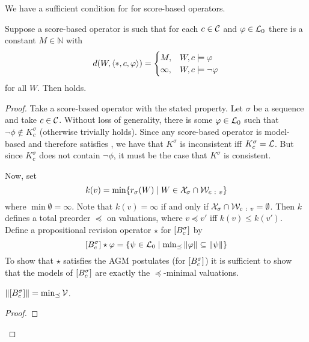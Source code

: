 We have a sufficient condition for \agm{} for score-based operators.

\begin{lemma}
    \label{kr_lemma_score_based_agm_sufficient_conditions}
    Suppose a score-based operator is such that for each $c \in \mathcal{C}$ and $\varphi
    \in \mathcal{L}{}_0$ there is a constant $M \in \mathbb{N}$ with
    \[
        d(W, \langle {\ast, c,  \varphi} \rangle)
        = \begin{cases}
            M,& W, c \models \varphi  \\
            \infty,& W, c \models \neg \varphi
        \end{cases}
    \]
    for all $W$. Then \agm{} holds.
\end{lemma}

\begin{proof}
    Take a score-based operator with the stated property. Let $\sigma$ be a
    sequence and take $c \in \mathcal{C}$. Without loss of generality, there is some
    $\varphi \in \mathcal{L}{}_0$ such that $\neg\phi \notin K^\sigma_c$ (otherwise \agm{}
    trivially holds). Since any score-based operator is model-based and
    therefore satisfies \closure{}, we have that $K^\sigma$ is inconsistent iff
    $K^\sigma_c = \mathcal{L}{}$. But since $K^\sigma_c$ does not contain $\neg\phi$,
    it must be the case that $K^\sigma$ is consistent.

    Now, set
    \[
        k(v)
        = \min\{
            r_\sigma(W)
            \mid
            W \in \mathcal{X}_\sigma \cap \mathcal{W}_{c\ :\ v}
        \}
    \]
    where $\min\emptyset =  \infty$. Note that $k(v) = \infty$ if and only if
    $\mathcal{X}_\sigma \cap \mathcal{W}_{c\ :\  v} = \emptyset$. Then $k$ defines a total
    preorder $\preceq$ on valuations, where $v \preceq v'$ iff $k(v) \le
    k(v')$. Define a propositional revision operator $\star$ for
    $\left[{B^\sigma_c}\right]$ by
    \[
        \left[{B^\sigma_c}\right] \star \varphi = \{
            \psi \in \mathcal{L}{}_0
            \mid
            \min\nolimits_{\preceq}{\|{\varphi}\|} \subseteq \|{\psi}\|
        \}
    \]
    To show that $\star$ satisfies the AGM postulates (for
    $\left[{B^\sigma_c}\right]$) it is sufficient to show that the models of
    $\left[{B^\sigma_c}\right]$ are exactly the $\preceq$-minimal valuations.

        \begin{claim}
            $\|{\left[{B^\sigma_c}\right]}\| = \min_{\preceq}{\mathcal{V}}$.
        \end{claim}
        \begin{proof}


\end{proof}
\end{proof}
